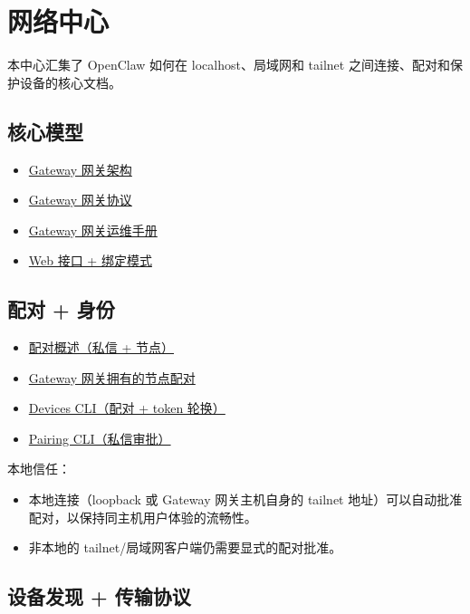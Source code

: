 \clearpage

\section{网络中心}


本中心汇集了 OpenClaw 如何在 localhost、局域网和 tailnet 之间连接、配对和保护设备的核心文档。

\subsection{核心模型}


\begin{itemize}
  \item \href{/concepts/architecture}{Gateway 网关架构}
  \item \href{/gateway/protocol}{Gateway 网关协议}
  \item \href{/gateway}{Gateway 网关运维手册}
  \item \href{/web}{Web 接口 + 绑定模式}
\end{itemize}


\subsection{配对 + 身份}


\begin{itemize}
  \item \href{/channels/pairing}{配对概述（私信 + 节点）}
  \item \href{/gateway/pairing}{Gateway 网关拥有的节点配对}
  \item \href{/cli/devices}{Devices CLI（配对 + token 轮换）}
  \item \href{/cli/pairing}{Pairing CLI（私信审批）}
\end{itemize}


本地信任：

\begin{itemize}
  \item 本地连接（loopback 或 Gateway 网关主机自身的 tailnet 地址）可以自动批准配对，以保持同主机用户体验的流畅性。
  \item 非本地的 tailnet/局域网客户端仍需要显式的配对批准。
\end{itemize}


\subsection{设备发现 + 传输协议}


